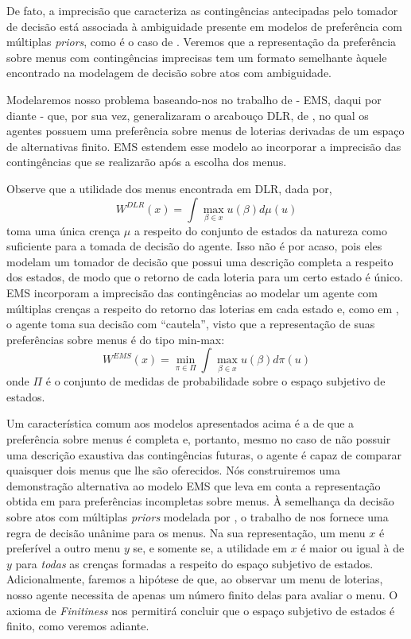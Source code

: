 \documentclass[11pt, a4paper]{article}
\theoremstyle{nonumberplain}
\theoremstyle{plain}
\theoremstyle{plain}
\theoremstyle{plain}
\begin{document}
De fato, a imprecisão que caracteriza as contingências antecipadas pelo tomador de decisão está associada à ambiguidade presente em modelos de preferência com múltiplas \emph{priors}, como é o caso de \cite{Gilboa1989}. Veremos que a representação da preferência sobre menus com contingências imprecisas tem um formato semelhante àquele encontrado na modelagem de decisão sobre atos com ambiguidade.   

Modelaremos nosso problema baseando-nos no trabalho de \cite{Epstein2007} - EMS, daqui por diante - que, por sua vez, generalizaram o arcabouço DLR, de \cite{Dekel2001}, no qual os agentes possuem uma preferência sobre menus de loterias derivadas de um espaço de alternativas finito. EMS estendem esse modelo ao incorporar a imprecisão das contingências que se realizarão após a escolha dos menus. 

Observe que a utilidade dos menus encontrada em DLR, dada por,               
$$ W^{DLR}(x)=\int \max_{\beta\in x}u(\beta)d\mu(u) $$
toma uma única crença $\mu$ a respeito do conjunto de estados da natureza como suficiente para a tomada de decisão do agente. Isso não é por acaso, pois eles modelam um tomador de decisão que possui uma descrição completa a respeito dos estados, de modo que o retorno de cada loteria para um certo estado é único. EMS incorporam a imprecisão das contingências ao modelar um agente com múltiplas crenças a respeito do retorno das loterias em cada estado e, como em \cite{Gilboa1989}, o agente toma sua decisão com ``cautela'', visto que a representação de suas preferências sobre menus é do tipo min-max: $$W^{EMS}(x)=\min_{\pi\in\Pi} \int \max_{\beta\in x}u(\beta)d\pi(u)$$ onde $\Pi$ é o conjunto de medidas de probabilidade sobre o espaço subjetivo de estados.

Um característica comum aos modelos apresentados acima é a de que a preferência sobre menus é completa e, portanto, mesmo no caso de não possuir uma descrição exaustiva das contingências futuras, o agente é capaz de comparar quaisquer dois menus que lhe são oferecidos. Nós construiremos uma demonstração alternativa ao modelo EMS que leva em conta a representação obtida em \cite{Kochov2007} para preferências incompletas sobre menus. À semelhança da decisão sobre atos com múltiplas \emph{priors} modelada por \cite{Gilboa2010}, o trabalho de \cite{Kochov2007} nos fornece uma regra de decisão unânime para os menus. Na sua representação, um menu $x$ é preferível a outro menu $y$ se, e somente se, a utilidade em $x$ é maior ou igual à de $y$ para \emph{todas} as crenças formadas a respeito do espaço subjetivo de estados. Adicionalmente, faremos a hipótese de que, ao observar um menu de loterias, nosso agente necessita de apenas um número finito delas para avaliar o menu. O axioma de \emph{Finitiness} nos permitirá concluir que o espaço subjetivo de estados é finito, como veremos adiante.
\end{document}
